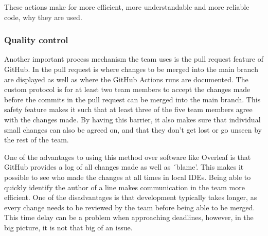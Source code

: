 These actions make for more efficient, more understandable and more reliable code, why they are used.


\subsubsection{Quality control}

Another important process mechanism the team uses is the pull request feature of GitHub.
In the pull request is where changes to be merged into the main branch are displayed as well as where the GitHub Actions
runs are documented.
The custom protocol is for at least two team members to accept the changes made before the commits in the pull request
can be merged into the main branch.
This safety feature makes it such that at least three of the five team members agree with the changes made.
By having this barrier, it also makes sure that individual small changes can also be agreed on, and that they don't get
lost or go unseen by the rest of the team.

One of the advantages to using this method over software like Overleaf is that GitHub provides a log of all changes made
as well as ´blame'.
This makes it possible to see who made the changes at all times in local IDEs.
Being able to quickly identify the author of a line makes communication in the team more efficient.
One of the disadvantages is that development typically takes longer, as every change needs to be reviewed by the team
before being able to be merged.
This time delay can be a problem when approaching deadlines, however, in the big picture, it is not that big of an
issue.
